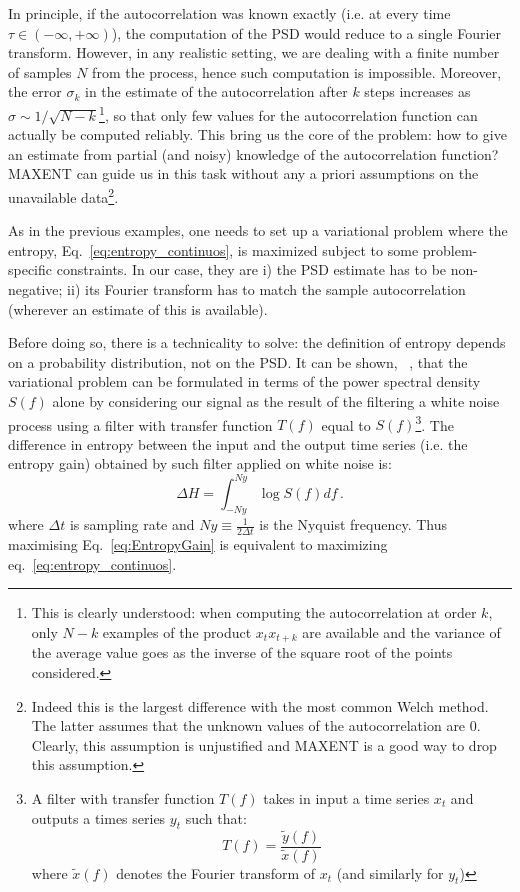 \documentclass{aa}
\begin{document}
In principle, if the autocorrelation was known exactly (i.e. at every time $\tau \in (-\infty,+\infty)$), the computation of the PSD 
would reduce to a single Fourier transform.
However, in any realistic setting, we are dealing with a finite number of samples $N$ from the process, hence such computation
is impossible.
Moreover, the error $\sigma_k$ in the estimate of the autocorrelation after $k$ steps increases as $\sigma \sim 1/\sqrt{N - k}$\footnote{
This is clearly understood: when computing the autocorrelation at order $k$, only $N-k$ examples of the product $x_t x_{t+k}$ are available and the variance of the average value goes as the inverse of the square root of the points considered.
}, so that only few values for the autocorrelation function can actually be computed reliably.
This bring us the core of the problem: how to give an estimate from partial (and noisy) knowledge of the autocorrelation function? MAXENT can guide us in this task without any a priori assumptions on the unavailable data\footnote{Indeed this is the largest difference with the most common Welch method. The latter assumes that the unknown values of the autocorrelation are $0$. Clearly, this assumption is unjustified and MAXENT is a good way to drop this assumption.}.

As in the previous examples, one needs to set up a variational problem where the entropy, Eq.~\eqref{eq:entropy_continuos}, is maximized 
subject to some problem-specific constraints. 
In our case, they are i) the PSD estimate has to be non-negative; ii) its Fourier transform has to match the sample autocorrelation (wherever an estimate of this is available).

Before doing so, there is a technicality to solve: the definition of entropy depends on a probability distribution, not on the PSD.
It can be shown, ~\citep[e.g.]{AblesMESA, Bartlett}, that the variational problem can be formulated in terms of the power spectral density $S(f)$ alone by considering our signal as the result of the filtering a white noise process using a filter with transfer function $T(f)$ equal to $S(f)$\footnote{
A filter with transfer function $T(f)$ takes in input a time series $x_t$ and outputs a times series $y_t$ such that:
$$T(f) = \frac{\tilde{y}(f)}{\tilde{x}(f)}$$
where $\tilde{x}(f)$ denotes the Fourier transform of $x_t$ (and similarly for $y_t$)
}.
The difference in entropy between the input and the output time series (i.e. the entropy gain) obtained by such filter applied on white noise is:
\begin{equation}\label{eq:EntropyGain}
    \Delta H = \int_{- Ny}^{Ny}\log S(f) df\,.
\end{equation}
where $\Delta t$ is sampling rate and $Ny \equiv \frac{1}{2 \Delta t}$  is the Nyquist frequency.
Thus maximising Eq.~\eqref{eq:EntropyGain} is equivalent to maximizing eq.~\eqref{eq:entropy_continuos}.
\end{document}
